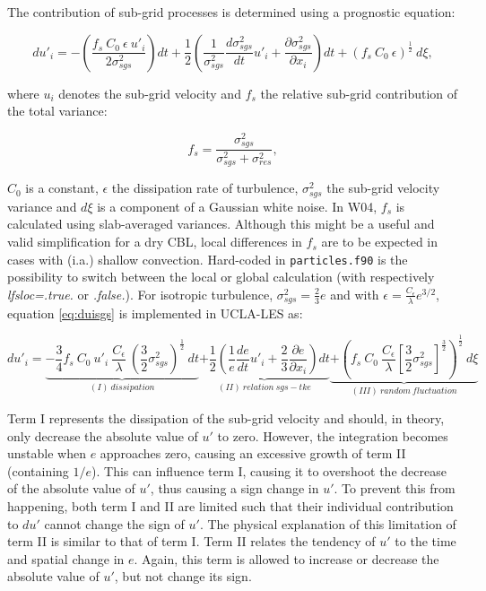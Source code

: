 \documentclass[twoside,a4paper]{report}
\begin{document}
The contribution of sub-grid processes is determined using a prognostic equation:

\begin{equation}
  du'_i = - \left(\frac{f_s \: C_0 \: \epsilon \: u'_i}{2 \sigma^2_{sgs}}\right)dt 
          + \frac{1}{2} \left( \frac{1}{\sigma^2_{sgs}} \frac{d\sigma^2_{sgs}}{dt} u'_i + \frac{\partial \sigma^2_{sgs}}{\partial x_i}\right) dt
          + (f_s \: C_0 \: \epsilon)^{\frac{1}{2}} \: d\xi,
\label{eq:duisgs}
\end{equation}

where $u_i$ denotes the sub-grid velocity and $f_s$ the relative sub-grid contribution of the total variance:

\begin{equation}
  f_s = \frac{\sigma^2_{sgs}}{\sigma^2_{sgs} + \sigma^2_{res}},
\label{eq:fs}
\end{equation}

$C_0$ is a constant, $\epsilon$ the dissipation rate of turbulence, $\sigma^2_{sgs}$ the sub-grid velocity variance and $d\xi$ is a component of a Gaussian white noise. 
In W04, $f_s$ is calculated using slab-averaged variances. Although this might be a useful and valid simplification for a dry CBL, local differences in $f_s$ are to be expected in cases with (i.a.) shallow convection. Hard-coded in \texttt{particles.f90} is the possibility to switch between the local or global calculation (with respectively \textit{lfsloc=.true.} or \textit{.false.}). For isotropic turbulence, $\sigma^2_{sgs} = \frac{2}{3}e$ and with $\epsilon = \frac{C_\epsilon}{\lambda}e^{3/2}$, equation \ref{eq:duisgs} is implemented in UCLA-LES as:

\begin{equation}
  du'_i = \underbrace{-\frac{3}{4} f_s \: C_0 \: u'_i \: \frac{C_\epsilon}{\lambda} \: \left(\frac{3}{2} \sigma^2_{sgs}\right)^\frac{1}{2} \: dt}_{(I) \: dissipation}
          \underbrace{+\frac{1}{2} \left( \frac{1}{e} \frac{de}{dt} u'_i + \frac{2}{3}\frac{\partial e}{\partial x_i}\right) dt}_{(II) \: relation \: sgs-tke}
          \underbrace{+\left(f_s \: C_0 \: \frac{C_\epsilon}{\lambda}\left[\frac{3}{2}\sigma^2_{sgs}\right]^{\frac{3}{2}}\right)^\frac{1}{2} \: d\xi}_{(III) \: random \: fluctuation}
\label{eq:duisgs_uclales}
\end{equation}

Term I represents the dissipation of the sub-grid velocity and should, in theory, only decrease the absolute value of $u'$ to zero. However, the integration becomes unstable when $e$ approaches zero, causing an excessive growth of term II (containing $1/e$). This can influence term I, causing it to overshoot the decrease of the absolute value of $u'$, thus causing a sign change in $u'$. To prevent this from happening, both term I and II are limited such that their individual contribution to $du'$ cannot change the sign of $u'$. The physical explanation of this limitation of term II is similar to that of term I. Term II relates the tendency of $u'$ to the time and spatial change in $e$. Again, this term is allowed to increase or decrease the absolute value of $u'$, but not change its sign. \newline
\end{document}
